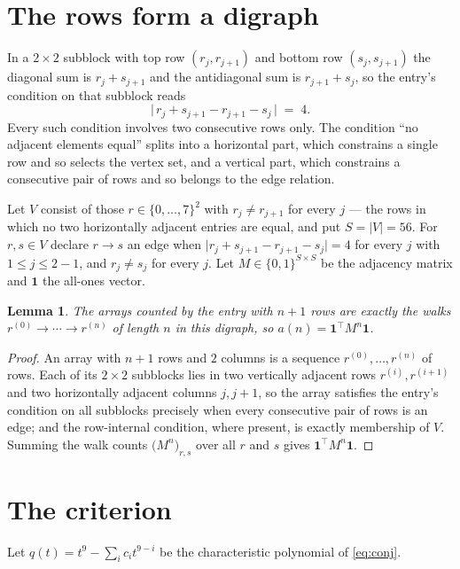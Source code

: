 \documentclass[11pt,a4paper]{article}
\theoremstyle{plain}
\newtheorem{lemma}[theorem]{Lemma}
\theoremstyle{definition}
\begin{document}
\section{The rows form a digraph}

In a $2\times2$ subblock with top row $(r_j,r_{j+1})$ and bottom row $(s_j,s_{j+1})$ the
diagonal sum is $r_j+s_{j+1}$ and the antidiagonal sum is $r_{j+1}+s_j$, so the entry's
condition on that subblock reads
\[
\bigl|\,r_j+s_{j+1}-r_{j+1}-s_j\,\bigr|\;=\;4.
\]
Every such condition involves two consecutive rows only. The condition ``no adjacent elements equal'' splits into a horizontal
part, which constrains a single row and so selects the vertex set, and a vertical part,
which constrains a consecutive pair of rows and so belongs to the edge relation.

Let $V$ consist of those $r\in\{0,\dots,7\}^{2}$ with $r_j\ne r_{j+1}$ for every
$j$ --- the rows in which no two horizontally adjacent entries are equal, and put $S=|V|=56$. For $r,s\in V$ declare $r\to s$ an edge
when $\bigl|r_j+s_{j+1}-r_{j+1}-s_j\bigr|=4$ for every $j$ with
$1\le j\le2-1$, and $r_j\ne s_j$ for every $j$. Let $M\in\{0,1\}^{S\times S}$ be the adjacency matrix and $\mathbf{1}$
the all-ones vector.

\begin{lemma}\label{lem:walk}
The arrays counted by the entry with $n+1$ rows are exactly the walks
$r^{(0)}\to\cdots\to r^{(n)}$ of length $n$ in this digraph, so
$a(n)=\mathbf{1}^{\!\top}M^{n}\mathbf{1}$.
\end{lemma}

\begin{proof}
An array with $n+1$ rows and $2$ columns is a sequence $r^{(0)},\dots,r^{(n)}$ of
rows. Each of its $2\times2$ subblocks lies in two vertically adjacent rows
$r^{(i)},r^{(i+1)}$ and two horizontally adjacent columns $j,j+1$, so the array satisfies
the entry's condition on all subblocks precisely when every consecutive pair of rows is an
edge; and the row-internal condition, where present, is exactly membership of $V$. Summing
the walk counts $\bigl(M^{n}\bigr)_{r,s}$ over all $r$ and $s$ gives
$\mathbf{1}^{\!\top}M^{n}\mathbf{1}$.
\end{proof}

\section{The criterion}

Let $q(t)=t^{9}-\sum_i c_i t^{9-i}$ be the characteristic polynomial of
\eqref{eq:conj}.
\end{document}
